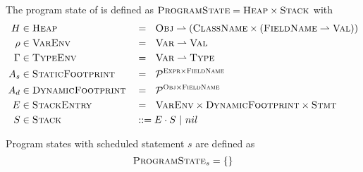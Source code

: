 The program state of \svl is defined as $\textsc{ProgramState} = \textsc{Heap} \times \textsc{Stack}$ with
\begin{align*}
	H      & \in \textsc{Heap}       &  & =~~ \textsc{Obj} \rightharpoonup (\textsc{ClassName} \times (\textsc{FieldName} \rightharpoonup \textsc{Val})) \\
	\rho   & \in \textsc{VarEnv}     &  & =~~ \textsc{Var} \rightharpoonup \textsc{Val}                                                        \\
	\Gamma & \in \textsc{TypeEnv}    &  & =~~ \textsc{Var} \rightharpoonup \textsc{Type}                                                       \\
	A_s    & \in \textsc{StaticFootprint} &  & =~~ \mathcal{P}^{\textsc{Expr} \times \textsc{FieldName}}                                                    \\
	A_d    & \in \textsc{DynamicFootprint} &  & =~~ \mathcal{P}^{\textsc{Obj} \times \textsc{FieldName}}                                                     \\
	E      & \in \textsc{StackEntry} &  & =~~ \textsc{VarEnv} \times \textsc{DynamicFootprint} \times \textsc{Stmt}                                       \\
	S      & \in \textsc{Stack}      &  & ::= E \cdot S ~|~ nil
\end{align*}




Program states with scheduled statement $s$ are defined as
\begin{displaymath}
\textsc{ProgramState}_s = \{  \}
\end{displaymath}
